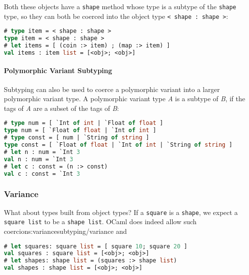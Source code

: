 Both these objects have a \passthrough{\lstinline!shape!} method whose
type is a subtype of the \passthrough{\lstinline!shape!} type, so they
can both be coerced into the object type
\passthrough{\lstinline!< shape : shape >!}:

\begin{lstlisting}[language=Caml]
# type item = < shape : shape >
type item = < shape : shape >
# let items = [ (coin :> item) ; (map :> item) ]
val items : item list = [<obj>; <obj>]
\end{lstlisting}

\hypertarget{polymorphic-variant-subtyping}{%
\paragraph{Polymorphic Variant
Subtyping}\label{polymorphic-variant-subtyping}}

Subtyping can also be used to coerce a polymorphic variant into a larger
polymorphic variant type. A polymorphic variant type \emph{A} is a
subtype of \emph{B}, if the tags of \emph{A} are a subset of the tags of
\emph{B}:

\begin{lstlisting}[language=Caml]
# type num = [ `Int of int | `Float of float ]
type num = [ `Float of float | `Int of int ]
# type const = [ num | `String of string ]
type const = [ `Float of float | `Int of int | `String of string ]
# let n : num = `Int 3
val n : num = `Int 3
# let c : const = (n :> const)
val c : const = `Int 3
\end{lstlisting}

\hypertarget{variance}{%
\subsubsection{Variance}\label{variance}}

What about types built from object types? If a
\passthrough{\lstinline!square!} is a \passthrough{\lstinline!shape!},
we expect a \passthrough{\lstinline!square list!} to be a
\passthrough{\lstinline!shape list!}. OCaml does indeed allow such
coercions:\protect\hypertarget{var}{}{variance}\protect\hypertarget{SUBvar}{}{subtyping/variance
and}

\begin{lstlisting}[language=Caml]
# let squares: square list = [ square 10; square 20 ]
val squares : square list = [<obj>; <obj>]
# let shapes: shape list = (squares :> shape list)
val shapes : shape list = [<obj>; <obj>]
\end{lstlisting}

